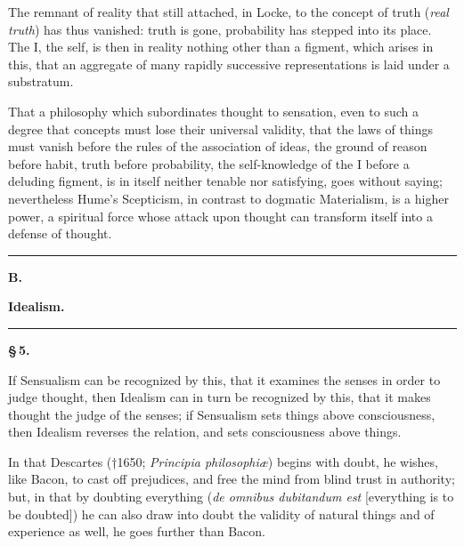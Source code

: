 \documentclass[12pt]{book}
\begin{document}
The remnant of reality that still attached, in Locke, to the concept of truth
(\textit{real truth}) has thus vanished: truth is gone, probability has stepped
into its place. The I, the self, is then in reality nothing other than a figment,
which arises in this, that an aggregate of many rapidly successive representations
is laid under a substratum.

That a philosophy which subordinates thought to sensation, even to such a degree
that concepts must lose their universal validity, that the laws of things must
vanish before the rules of the association of ideas, the ground of reason before
habit, truth before probability, the self-knowledge of the I before a deluding
figment, is in itself neither tenable nor satisfying, goes without saying;
nevertheless Hume's Scepticism, in contrast to dogmatic Materialism, is a higher
power, a spiritual force whose attack upon thought can transform itself into a
defense of thought.

\begin{center}\rule{2.5cm}{0.4pt}\end{center}
\begin{center}
  {\large\bfseries B.}\par\vspace{2pt}
  {\bfseries Idealism.}\par\vspace{4pt}
  \rule{2cm}{0.4pt}
\end{center}
{}

\begin{center}{\bfseries \S\,5.}\end{center}

\noindent If Sensualism can be recognized by this, that it examines the senses in
order to judge thought, then Idealism can in turn be recognized by this, that it
makes thought the judge of the senses; if Sensualism sets things above
consciousness, then Idealism reverses the relation, and sets consciousness above
things.

In that Descartes (†1650; \textit{Principia philosophiæ}) begins with doubt, he
wishes, like Bacon, to cast off prejudices, and free the mind from blind trust in
authority; but, in that by doubting everything (\textit{de omnibus dubitandum est}
[everything is to be doubted]) he can also
draw into doubt the validity of natural things and of experience as well, he goes
further than Bacon.
\end{document}
